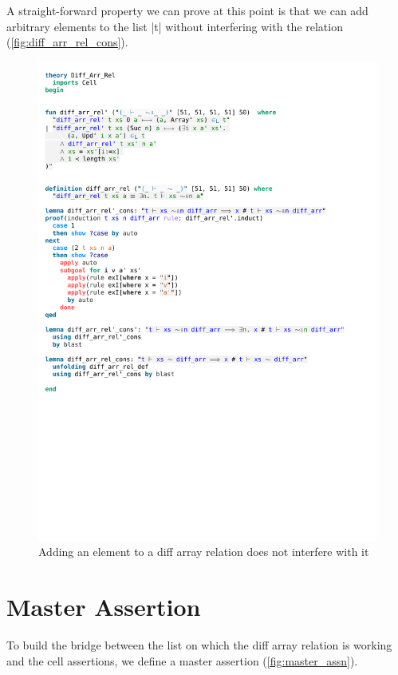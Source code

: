 \noindent A straight-forward property we can prove at this point is that we can add arbitrary elements to the list |t| without interfering with the relation (\autoref{fig:diff_arr_rel_cons}).

\begin{figure}[htpb]
    \includegraphics[trim={0 11cm 0 18,2cm}, clip, width=1.00\textwidth]{figures/Theory_Diff_Arr_Rel.pdf}
    \caption[Add element to diff array relation]{Adding an element to a diff array relation does not interfere with it}
    \label{fig:diff_arr_rel_cons}
\end{figure}

\section{Master Assertion}\label{section:master_assn}

To build the bridge between the list on which the diff array relation is working and the cell assertions, we define a master assertion (\autoref{fig:master_assn}). 

